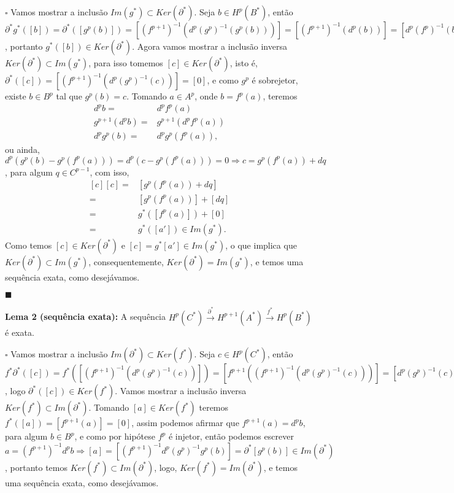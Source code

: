 \documentclass{article}
\begin{document}
	$\square$ Vamos mostrar a inclusão $Im(g^{*}) \subset Ker(\partial^{*})$. Seja $b \in H^{p}(B^{*})$, então $\partial^{*}g^{*}([b]) = \partial^{*}([g^{p}(b)]) = [(f^{p+1})^{-1}(d^{p}(g^{p})^{-1}(g^{p}(b)))] = [(f^{p+1})^{-1}(d^{p}(b))] = [d^{p}(f^{p})^{-1}(b)] = [0]$, portanto $g^{*}([b]) \in Ker(\partial^{*})$. Agora vamos mostrar a inclusão inversa $Ker(\partial^{*}) \subset Im(g^{*})$, para isso tomemos $[c] \in Ker(\partial^{*})$, isto é, $\partial^{*}([c]) = [(f^{p+1})^{-1}(d^{p}(g^{p})^{-1}(c))] = [0]$, e como $g^{p}$ é sobrejetor, existe $b \in B^{p}$ tal que $g^{p}(b) = c$. Tomando $a \in A^{p}$, onde $b = f^{p}(a)$, teremos 
	$$
	\begin{aligned}
	d^{p}b =& d^{p}f^{p}(a)
	\\
	g^{p+1}(d^{p}b) =&  g^{p+1}(d^{p}f^{p}(a)) 
	\\
	d^{p}g^{p}(b) =& d^{p}g^{p}(f^{p}(a)),
	\end{aligned}
	$$
	ou ainda, $d^{p}(g^{p}(b) - g^{p}(f^{p}(a)))=d^{p}(c - g^{p}(f^{p}(a)))=0 \Rightarrow c = g^{p}(f^{p}(a)) + dq$, para algum $q \in C^{p-1}$, com isso, 
	$$
	\begin{aligned}
	[c][c] =& [g^{p}(f^{p}(a)) + dq] 
	\\
	=& [g^{p}(f^{p}(a))] + [dq] 
	\\
	=& g^{*}([f^{p}(a)]) +[0] 
	\\
	=& g^{*}([a']) \in  Im(g^{*}).
	\end{aligned}
	$$
	Como temos $[c] \in Ker(\partial^{*})$ e $[c] = g^{*}[a'] \in Im(g^{*})$, o que implica que $Ker(\partial^{*}) \subset Im(g^{*})$, consequentemente, $Ker(\partial^{*}) = Im(g^{*})$, e temos uma sequência exata, como desejávamos. 
	
	$\blacksquare$
	
	\vspace{2 mm}
	\textbf{Lema 2 (sequência exata):} A sequência $H^{p}(C^{*}) \xrightarrow{\partial^{*}} H^{p+1}(A^{*}) \xrightarrow{f^{*}}  H^{p}(B^{*})$ é exata.
	
	$\square$ Vamos mostrar a inclusão  $Im(\partial^{*}) \subset Ker(f^{*})$. Seja $c \in H^{p}(C^{*})$, então $f^{*}\partial^{*}([c]) = f^{*}([(f^{p+1})^{-1}(d^{p}(g^{p})^{-1}(c))]) = [f^{p+1}((f^{p+1})^{-1}(d^{p}(g^{p})^{-1}(c)))] = [d^{p}(g^{p})^{-1}(c)] = [0]$, logo $\partial^{*}([c]) \in Ker(f^{*})$. Vamos mostrar a inclusão inversa $Ker(f^{*}) \subset Im(\partial^{*}) $. Tomando $[a] \in Ker(f^{*})$ teremos $f^{*}([a]) = [f^{p+1}(a)] = [0]$, assim podemos afirmar que $f^{p+1}(a) = d^{p}b$, para algum $b \in B^{p}$, e como por hipótese $f^{p}$ é injetor, então podemos escrever $a = (f^{p+1})^{-1}d^{p}b \Rightarrow [a] = [(f^{p+1})^{-1}d^{p}(g^{p})^{-1}g^{p}(b)] = \partial^{*}[g^{p}(b)] \in Im(\partial^{*})$, portanto temos $Ker(f^{*}) \subset Im(\partial^{*})$, logo, $Ker(f^{*}) = Im(\partial^{*})$, e temos uma sequência exata, como desejávamos. 
	
\end{document}
